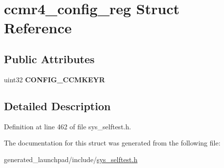 \hypertarget{structccmr4__config__reg}{}\section{ccmr4\+\_\+config\+\_\+reg Struct Reference}
\label{structccmr4__config__reg}
\subsection*{Public Attributes}
\begin{DoxyCompactItemize}
\item 
\mbox{\label{structccmr4__config__reg_a0dab05cea4994d28eb085a3256ccd525}} 
uint32 {\bfseries C\+O\+N\+F\+I\+G\+\_\+\+C\+C\+M\+K\+E\+YR}
\end{DoxyCompactItemize}


\subsection{Detailed Description}


Definition at line 462 of file sys\+\_\+selftest.\+h.



The documentation for this struct was generated from the following file\+:\begin{DoxyCompactItemize}
\item 
generated\+\_\+launchpad/include/\mbox{\hyperlink{sys__selftest_8h}{sys\+\_\+selftest.\+h}}\end{DoxyCompactItemize}

